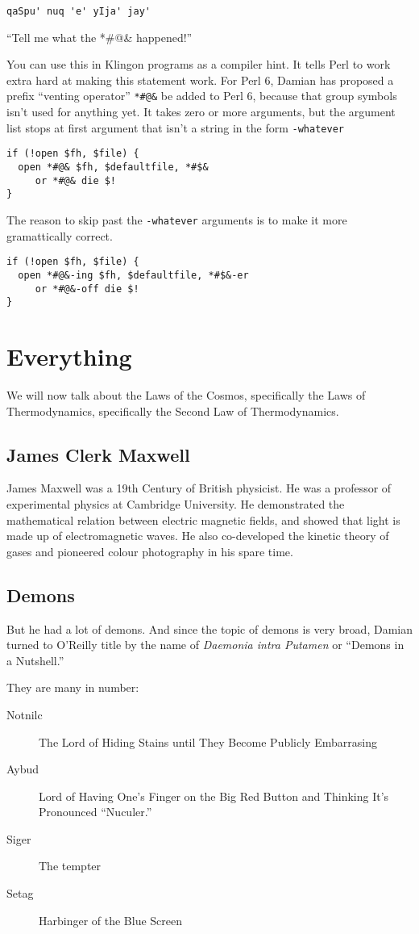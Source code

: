 \documentclass{article}
\begin{document}
\verb"qaSpu' nuq 'e' yIja' jay'" 

\hspace{\parindent}``Tell me what the *\#@\& happened!''

You can use this in Klingon programs as a compiler hint.  It tells Perl
to work extra hard at
making this statement work.  For Perl 6, Damian has proposed a prefix 
``venting operator'' \verb"*#@&" be added to
Perl 6, because that group symbols isn't used for anything yet.  
It takes zero or more
arguments, but the argument list stops at first argument that 
isn't a string in the form \verb"-whatever"
\begin{verbatim}
if (!open $fh, $file) {
  open *#@& $fh, $defaultfile, *#$&
     or *#@& die $!
}
\end{verbatim}
The reason to skip past the \verb"-whatever" arguments is to make it more
gramattically correct.
\begin{verbatim}
if (!open $fh, $file) {
  open *#@&-ing $fh, $defaultfile, *#$&-er
     or *#@&-off die $!
}
\end{verbatim}

\section{Everything}
We will now talk about the Laws of the Cosmos, specifically the Laws of
Thermodynamics, specifically the Second Law of Thermodynamics.

\subsection{James Clerk Maxwell}
James Maxwell was a 19th Century of British physicist.  He was a 
professor of experimental
physics at Cambridge University.  He demonstrated the mathematical 
relation between electric magnetic fields, and showed that light is 
made up of electromagnetic waves. He also co-developed the kinetic theory 
of gases and pioneered colour photography in his spare time.

\subsection{Demons}
But he had a lot of demons.  And since the topic of demons is very
broad, Damian turned to O'Reilly title by the name of \textit{Daemonia 
intra Putamen} or ``Demons in a Nutshell.''

They are many in number:
\begin{description}
\item[Notnilc]The Lord of Hiding Stains until They Become Publicly Embarrasing
\item[Aybud] Lord of Having One's Finger on the Big Red Button and Thinking
It's Pronounced ``Nuculer.''
\item[Siger] The tempter
\item[Setag] Harbinger of the Blue Screen
\end{description}
\end{document}
